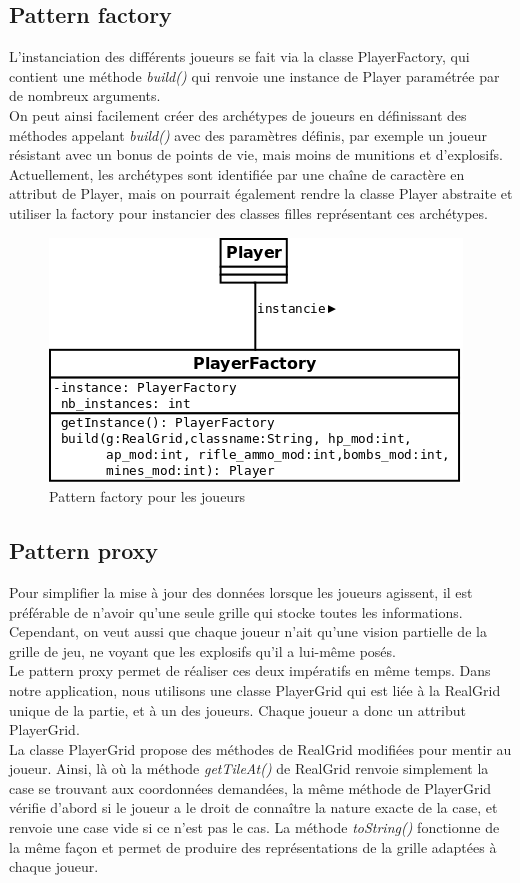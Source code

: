 \documentclass[a4paper,12pt]{article} %
\begin{document}
\subsection{Pattern factory}

L'instanciation des différents joueurs se fait via la classe PlayerFactory, qui contient une méthode \textit{build()} qui renvoie une instance de Player paramétrée par de nombreux arguments.\\
On peut ainsi facilement créer des archétypes de joueurs en définissant des méthodes appelant \textit{build()} avec des paramètres définis, par exemple un joueur résistant avec un bonus de points de vie, mais moins de munitions et d'explosifs.\\
Actuellement, les archétypes sont identifiée par une chaîne de caractère en attribut de Player, mais on pourrait également rendre la classe Player abstraite et utiliser la factory pour instancier des classes filles représentant ces archétypes.\\

\begin{figure}[!h]
\centering
\includegraphics[scale=0.5]{images/factory.png}
\caption{Pattern factory pour les joueurs}
\end{figure}

\subsection{Pattern proxy}

Pour simplifier la mise à jour des données lorsque les joueurs agissent, il est préférable de n'avoir qu'une seule grille qui stocke toutes les informations. Cependant, on veut aussi que chaque joueur n'ait qu'une vision partielle de la grille de jeu, ne voyant que les explosifs qu'il a lui-même posés.\\
Le pattern proxy permet de réaliser ces deux impératifs en même temps. Dans notre application, nous utilisons une classe PlayerGrid qui est liée à la RealGrid unique de la partie, et à un des joueurs. Chaque joueur a donc un attribut PlayerGrid.\\
La classe PlayerGrid propose des méthodes de RealGrid modifiées pour mentir au joueur. Ainsi, là où la méthode \textit{getTileAt()} de RealGrid renvoie simplement la case se trouvant aux coordonnées demandées, la même méthode de PlayerGrid vérifie d'abord si le joueur a le droit de connaître la nature exacte de la case, et renvoie une case vide si ce n'est pas le cas. La méthode \textit{toString()} fonctionne de la même façon et permet de produire des représentations de la grille adaptées à chaque joueur.
\end{document}
